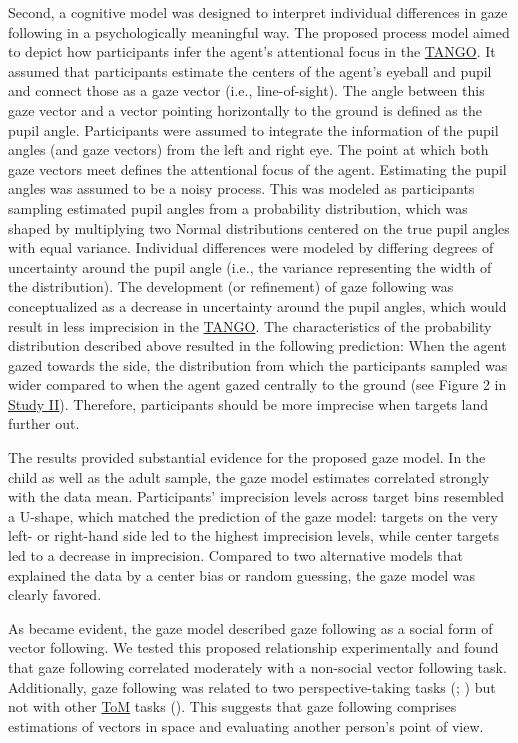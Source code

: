 \documentclass[
]{scrbook}
\begin{document}
Second, a cognitive model was designed to interpret individual differences in gaze following in a psychologically meaningful way. The proposed process model aimed to depict how participants infer the agent's attentional focus in the \hyperref[acronyms_TANGO]{TANGO}. It assumed that participants estimate the centers of the agent's eyeball and pupil and connect those as a gaze vector (i.e., line-of-sight). The angle between this gaze vector and a vector pointing horizontally to the ground is defined as the pupil angle. Participants were assumed to integrate the information of the pupil angles (and gaze vectors) from the left and right eye. The point at which both gaze vectors meet defines the attentional focus of the agent. Estimating the pupil angles was assumed to be a noisy process. This was modeled as participants sampling estimated pupil angles from a probability distribution, which was shaped by multiplying two Normal distributions centered on the true pupil angles with equal variance. Individual differences were modeled by differing degrees of uncertainty around the pupil angle (i.e., the variance representing the width of the distribution). The development (or refinement) of gaze following was conceptualized as a decrease in uncertainty around the pupil angles, which would result in less imprecision in the \hyperref[acronyms_TANGO]{TANGO}. The characteristics of the probability distribution described above resulted in the following prediction: When the agent gazed towards the side, the distribution from which the participants sampled was wider compared to when the agent gazed centrally to the ground (see Figure 2 in \hyperref[studyII]{Study II}). Therefore, participants should be more imprecise when targets land further out.

The results provided substantial evidence for the proposed gaze model. In the child as well as the adult sample, the gaze model estimates correlated strongly with the data mean. Participants' imprecision levels across target bins resembled a U-shape, which matched the prediction of the gaze model: targets on the very left- or right-hand side led to the highest imprecision levels, while center targets led to a decrease in imprecision. Compared to two alternative models that explained the data by a center bias or random guessing, the gaze model was clearly favored.

As became evident, the gaze model described gaze following as a social form of vector following. We tested this proposed relationship experimentally and found that gaze following correlated moderately with a non-social vector following task. Additionally, gaze following was related to two perspective-taking tasks (; ) but not with other \hyperref[acronyms_ToM]{ToM} tasks (). This suggests that gaze following comprises estimations of vectors in space and evaluating another person's point of view.
\end{document}
